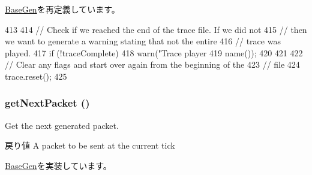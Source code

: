\hyperlink{classBaseGen_acbd8338aaa3340f10faecd6d2f759324}{BaseGen}を再定義しています。


\begin{DoxyCode}
413 {
414     // Check if we reached the end of the trace file. If we did not
415     // then we want to generate a warning stating that not the entire
416     // trace was played.
417     if (!traceComplete) {
418         warn("Trace player %
419              name());
420     }
421 
422     // Clear any flags and start over again from the beginning of the
423     // file
424     trace.reset();
425 }
\end{DoxyCode}
\hypertarget{classTraceGen_a938aa9841a9a62a776afbd0768af5379}{
\subsubsection[{getNextPacket}]{ getNextPacket ()}}
\label{classTraceGen_a938aa9841a9a62a776afbd0768af5379}
Get the next generated packet.

\begin{DoxyReturn}{戻り値}
A packet to be sent at the current tick 
\end{DoxyReturn}


\hyperlink{classBaseGen_a6cdb7c977e91dfc33aeea10a3dfcefed}{BaseGen}を実装しています。


